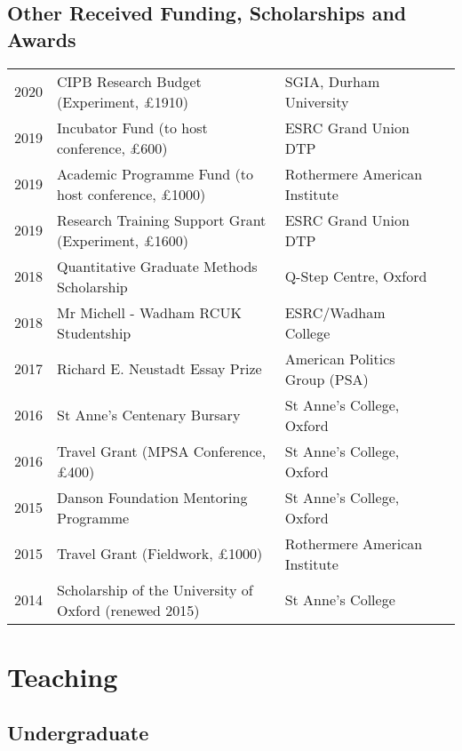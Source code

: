 \documentclass[11pt, a4paper]{article}
\begin{document}
\subsection*{Other Received Funding, Scholarships and Awards}
 \begin{tabular}{llll}
     2020 & CIPB Research Budget (Experiment, £1910) & SGIA, Durham University \\
     2019 & Incubator Fund (to host conference, £600) & ESRC Grand Union DTP \\
     2019 & Academic Programme Fund (to host conference, £1000) & Rothermere American Institute \\
     2019 & Research Training Support Grant (Experiment, £1600) & ESRC Grand Union DTP \\
     2018 & Quantitative Graduate Methods Scholarship & Q-Step Centre, Oxford \\
     2018 & Mr Michell - Wadham RCUK Studentship & ESRC/Wadham College\\
     2017 & Richard E. Neustadt Essay Prize & American Politics Group (PSA) \\
     2016 & St Anne's Centenary Bursary & St Anne's College, Oxford \\
     2016 & Travel Grant (MPSA Conference, £400) & St Anne's College, Oxford \\
     2015 & Danson Foundation Mentoring Programme & St Anne's College, Oxford \\
     2015 & Travel Grant (Fieldwork, £1000) & Rothermere American Institute \\
     2014 & Scholarship of the University of Oxford (renewed 2015) & St Anne's College

 \end{tabular}

 \section*{Teaching}
 \subsection*{Undergraduate} 
\end{document}

